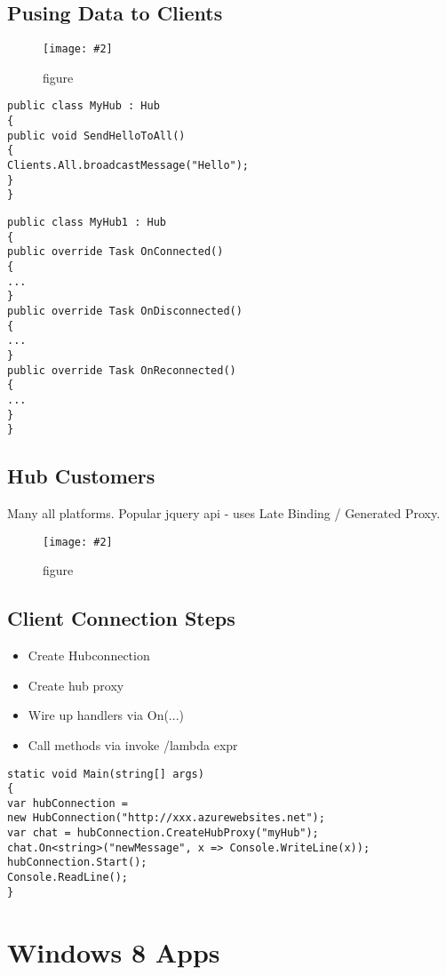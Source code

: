 \documentclass[a4paper,10pt]{scrreprt}
\newcommand{\pic}[2][figure]{\begin{figure}[h]
 \centering
 \texttt{[image: \#2]}
 \caption{#1}
\end{figure}
}
\begin{document}
\section{Pusing Data to Clients}
\pic{pdc.png}
\begin{lstlisting}[caption=Pushing Data to Clients]
 public class MyHub : Hub
{
public void SendHelloToAll()
{
Clients.All.broadcastMessage("Hello");
}
}
\end{lstlisting}
\begin{lstlisting}[caption=Hub Lifecycle]
 public class MyHub1 : Hub
{
public override Task OnConnected()
{
...
}
public override Task OnDisconnected()
{
...
}
public override Task OnReconnected()
{
...
}
}
\end{lstlisting}

\section{Hub Customers}

Many all platforms. Popular jquery api -  uses Late Binding / Generated Proxy.
\pic{jquerycode.png}

\section{Client Connection Steps}
\begin{itemize}
 \item Create Hubconnection
 \item Create hub proxy
 \item Wire up handlers via On(...)
 \item Call methods via invoke /lambda expr
\end{itemize}

\begin{lstlisting}[caption=client example signalr]
 static void Main(string[] args)
{
var hubConnection =
new HubConnection("http://xxx.azurewebsites.net");
var chat = hubConnection.CreateHubProxy("myHub");
chat.On<string>("newMessage", x => Console.WriteLine(x));
hubConnection.Start();
Console.ReadLine();
}
\end{lstlisting}

\chapter{Windows 8 Apps}
\end{document}
